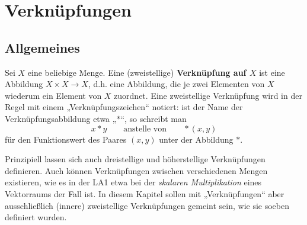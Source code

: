 



\chapter{Verknüpfungen} \label{chap:verknuepfungen}


\section{Allgemeines}


\begin{defin}[Verknüpfung] \label{def:verknuepfung} 
    Sei $X$ eine beliebige Menge. Eine (zweistellige) \textbf{Verknüpfung auf $X$} ist eine Abbildung $X\times X \to X$, d.h. eine Abbildung, die je zwei Elementen von $X$ wiederum ein Element von $X$ zuordnet. Eine zweistellige Verknüpfung wird in der Regel mit einem „Verknüpfungszeichen“ notiert: ist der Name der Verknüpfungsabbildung etwa „$*$“, so schreibt man
        \[ x*y \qquad\text{anstelle von}\qquad *(x,y) \]
    für den Funktionswert des Paares $(x,y)$ unter der Abbildung $*$.
\end{defin}


\begin{bem}[* Verallgemeinerungen]
    Prinzipiell lassen sich auch dreistellige und höherstellige Verknüpfungen definieren. Auch können Verknüpfungen zwischen verschiedenen Mengen existieren, wie es in der LA1 etwa bei der \emph{skalaren Multiplikation} eines Vektorraums der Fall ist. In diesem Kapitel sollen mit „Verknüpfungen“ aber ausschließlich (innere) zweistellige Verknüpfungen gemeint sein, wie sie soeben definiert wurden.
\end{bem}


